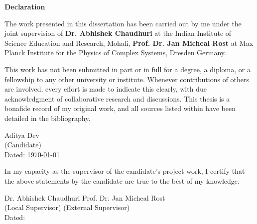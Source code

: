\begin{center}
    \textbf{\Large Declaration}
\end{center}
The work presented in this dissertation has been carried out by me under the joint supervision of 
\textbf{Dr. Abhishek Chaudhuri} at the Indian Institute of Science Education and Research, Mohali, 
\textbf{Prof. Dr.  Jan Micheal Rost} 
at Max Planck Institute for the Physics of Complex Systems, Dresden Germany. 

\vspace{0.4cm}

This work has not been submitted in part or in full for a degree, a diploma, or a fellowship to any other university or institute. Whenever contributions of others are involved, every effort is made to indicate this clearly, with due acknowledgment of collaborative research and discussions. This thesis is a bonafide record of my original work, and all sources listed within have been detailed in the bibliography.

\vspace{2cm}

\begin{flushright}
Aditya Dev
\\
(Candidate)
\\
Dated: {\color{white} \today}
\end{flushright}

In my capacity as the supervisor of the candidate's project work, I certify that the above statements by the candidate are true to the best of my knowledge.

\vspace{2cm}

\begin{flushleft}
    Dr. Abhishek Chaudhuri \hfill Prof. Dr. Jan Micheal Rost 
    \\
    (Local Supervisor) \hfill (External Supervisor)
    \\
    \vfill
    Dated: 
\end{flushleft}